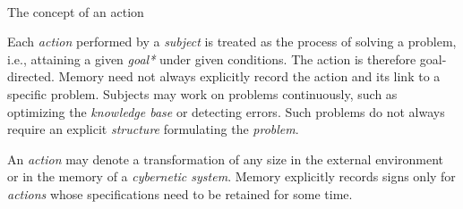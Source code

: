 \begin{frame}{\\The concept of an action}
\topline
\justifying
	\setlength{\emergencystretch}{2em}
\vspace{10mm}
 \begin{SCn}
	\begin{scnindent}
	\end{scnindent}
\end{SCn}
\end{frame}

\begin{frame}{}
\begin{SCn}

\end{SCn}
\end{frame}

\begin{frame}{}
\justifying
\vspace{10mm}
Each \textit{action} performed by a \textit{subject} is treated as the process of solving a problem, i.e., attaining a given \textit{goal*} under given conditions. The action is therefore goal-directed. Memory need not always explicitly record the action and its link to a specific problem. Subjects may work on problems continuously, such as optimizing the \textit{knowledge base} or detecting errors. Such problems do not always require an explicit \textit{structure} formulating the \textit{problem}.

An \textit{action} may denote a transformation of any size in the external environment or in the memory of a \textit{cybernetic system}. Memory explicitly records signs only for \textit{actions} whose specifications need to be retained for some time.
\end{frame}

